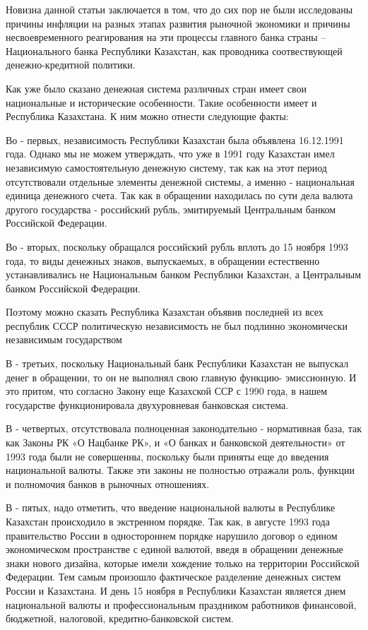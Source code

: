 \begin{multicols}{2}
Новизна данной статьи заключается в том, что до сих пор не были
исследованы причины инфляции на разных этапах развития рыночной
экономики и причины несвоевременного реагирования на эти процессы
главного банка страны -- Национального банка Республики Казахстан, как
проводника соотвествующей денежно-кредитной политики.

Как уже было сказано денежная система различных стран имеет свои
национальные и исторические особенности. Такие особенности имеет и
Республика Казахстана. К ним можно отнести следующие факты:

Во - первых, независимость Республики Казахстан была объявлена
16.12.1991 года. Однако мы не можем утверждать, что уже в 1991 году
Казахстан имел независимую самостоятельную денежную систему, так как на
этот период отсутствовали отдельные элементы денежной системы, а именно
- национальная единица денежного счета. Так как в обращении находилась
по сути дела валюта другого государства - российский рубль, эмитируемый
Центральным банком Российской Федерации.

Во - вторых, поскольку обращался российский рубль вплоть до 15 ноября
1993 года, то виды денежных знаков, выпускаемых, в обращении естественно
устанавливались не Национальным банком Республики Казахстан, а
Центральным банком Российской Федерации.

Поэтому можно сказать Республика Казахстан объявив последней из всех
республик СССР политическую независимость не был подлинно экономически
независимым государством

В - третьих, поскольку Национальный банк Республики Казахстан не
выпускал денег в обращении, то он не выполнял свою главную функцию-
эмиссионную. И это притом, что согласно Закону еще Казахской ССР с 1990
года, в нашем государстве функционировала двухуровневая банковская
система.

В - четвертых, отсутствовала полноценная законодательно - нормативная
база, так как Законы РК «О Нацбанке РК», и «О банках и банковской
деятельности» от 1993 года были не совершенны, поскольку были приняты
еще до введения национальной валюты. Также эти законы не полностью
отражали роль, функции и полномочия банков в рыночных отношениях.

В - пятых, надо отметить, что введение национальной валюты в Республике
Казахстан происходило в экстренном порядке. Так как, в августе 1993 года
правительство России в одностороннем порядке нарушило договор о едином
экономическом пространстве с единой валютой, введя в обращении денежные
знаки нового дизайна, которые имели хождение только на территории
Российской Федерации. Тем самым произошло фактическое разделение
денежных систем России и Казахстана. И день 15 ноября в Республики
Казахстан является днем национальной валюты и профессиональным
праздником работников финансовой, бюджетной, налоговой,
кредитно-банковской систем.


\end{multicols}
